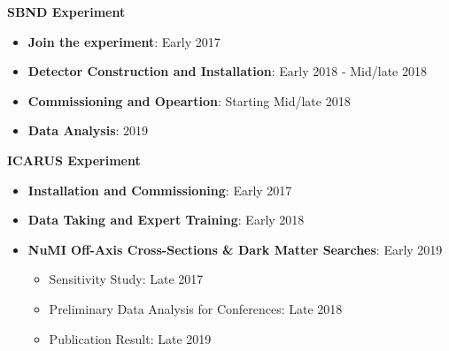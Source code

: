 \noindent\textbf{SBND Experiment}
\begin{itemize}[noitemsep,nolistsep]
\item{\textbf{Join the experiment}}: Early 2017
\item{\textbf{Detector Construction and Installation}}: Early 2018 - Mid/late 2018
\item{\textbf{Commissioning and Opeartion}}: Starting Mid/late 2018 
\item{\textbf{Data Analysis}}: 2019
\end{itemize}

\noindent\textbf{ICARUS Experiment}
\begin{itemize}[noitemsep,nolistsep]
\item{\textbf{Installation and Commissioning}}: Early 2017
\item{\textbf{Data Taking and Expert Training}}: Early 2018
\item{\textbf{NuMI Off-Axis Cross-Sections \& Dark Matter Searches}}: Early 2019
\begin{itemize}[noitemsep,nolistsep]
\item{Sensitivity Study: Late 2017}
\item{Preliminary Data Analysis for Conferences: Late 2018}
\item{Publication Result: Late 2019}
\end{itemize}

\end{itemize}

	
